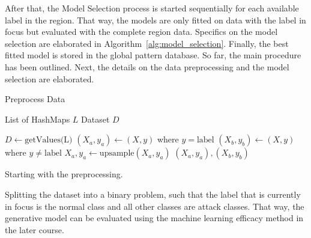 After that, the Model Selection process is started sequentially for each available label in the region. That way, the models are only fitted on data with the label in focus but evaluated with the complete region data. Specifics on the model selection are elaborated in Algorithm~\ref{alg:model_selection}. Finally, the best fitted model is stored in the global pattern database. So far, the main procedure has been outlined. Next, the details on the data preprocessing and the model selection are elaborated.

 \begin{algorithm}
    \caption{Preprocess Data}
    \label{alg:data_preprocessing}
 
    \begin{algorithmic}[1]
        \REQUIRE List of HashMaps $L$
        \ENSURE Dataset $D$
        
        \STATE $D \leftarrow \text{getValues(L)}$
                \STATE {}
                \STATE $(X_a, y_a) \leftarrow (X, y)$ where $y=\text{label}$ 
                \STATE $(X_b, y_b) \leftarrow (X, y)$ where $y \neq \text{label}$
                    \STATE $X_a, y_a \leftarrow \text{upsample}(X_a, y_a)$
                \ENDIF
            \ENDIF
        \ENDFOR
        \RETURN $(X_a, y_a), (X_b, y_b)$
    \end{algorithmic}
 \end{algorithm}

 Starting with the preprocessing.

 Splitting the dataset into a binary problem, such that the label that is currently in focus is the normal class and all other classes are attack classes. That way, the generative model can be evaluated using the machine learning efficacy method in the later course. 

